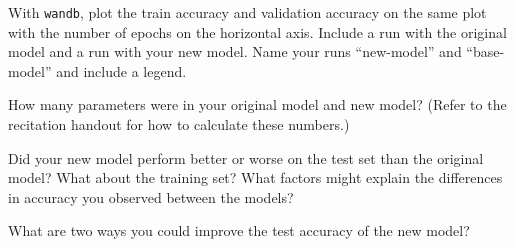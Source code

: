 \documentclass[11pt,addpoints,answers]{exam}
\begin{document}
\begin{questions}
\begin{parts}
\begin{subparts}
\begin{answer_box}[title=,height=3cm, width=10cm]
\begin{center}
        \end{center}
        \end{answer_box}
        
    \subpart[4] With \lstinline{wandb}, plot the train accuracy and validation accuracy on the same plot with the number of epochs on the horizontal axis. Include a run with the original model and a run with your new model. Name your runs ``new-model'' and ``base-model'' and include a legend. 
        
        \begin{answer_box}[title=,height=8cm, width=15cm]
        \end{answer_box}

    \subpart[2] How many parameters were in your original model and new model? (Refer to the recitation handout for how to calculate these numbers.)

        \begin{answer_box}[title=Original model,height=2cm, width=4cm]
        \end{answer_box}
        
        \begin{answer_box}[title=New model,height=2cm, width=4cm]
        \end{answer_box}

\clearpage

    \subpart[2] Did your new model perform better or worse on the test set than the original model? What about the training set? What factors might explain the differences in accuracy you observed between the models?

        \begin{answer_box}[title=,height=8cm, width=15cm]
        \end{answer_box}

    \subpart[2] What are two ways you could improve the test accuracy of the new model?

    \begin{answer_box}[title=,height=4cm, width=15cm]
    \end{answer_box}

\end{subparts}

\end{parts}

\clearpage


\end{questions}
\end{document}
